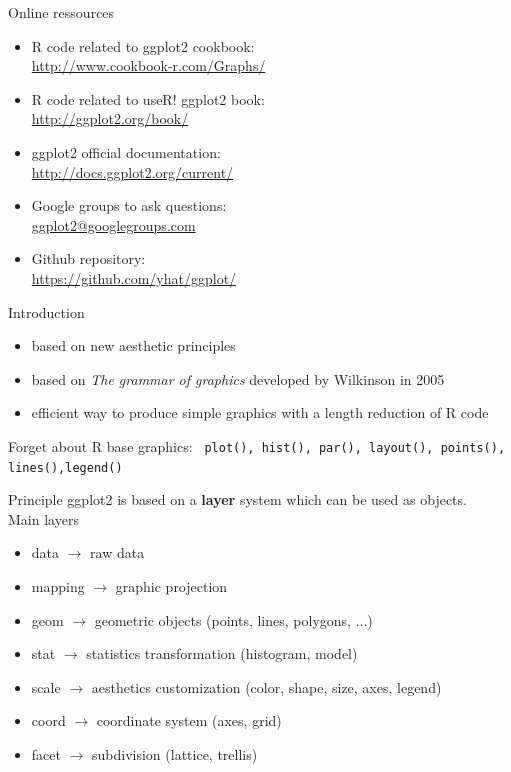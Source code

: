 \documentclass{beamer}\usepackage[]{graphicx}\usepackage[]{color}
\begin{document}
\begin{frame}{Online ressources}
    	\begin{itemize}
        \item R code related to ggplot2 cookbook:\\ \url{http://www.cookbook-r.com/Graphs/}
        \item R code related to useR! ggplot2 book:\\ \url{http://ggplot2.org/book/}
  		  \item ggplot2 official documentation:\\  \url{http://docs.ggplot2.org/current/}
			  \item Google groups to ask questions:\\ \url{ggplot2@googlegroups.com}
        \item Github repository:\\ \url{https://github.com/yhat/ggplot/}
			\end{itemize}
\end{frame}


\begin{frame}{Introduction}
  \begin{itemize}
    \item based on new aesthetic principles
    \item based on \textit{The grammar of graphics} developed by Wilkinson in 2005
    \item efficient way to produce simple graphics with a length reduction of R code
  \end{itemize}
  
  \begin{alertblock}{Forget about R base graphics:}
     \texttt{ plot(), hist(), par(), layout(), points(), lines(),legend()}
  \end{alertblock}
\end{frame}

\begin{frame}{Principle}
ggplot2 is based on a \textbf{layer} system which can be used as objects.\\
\vspace{1cm}
Main layers
  \begin{itemize}
    \item data $\rightarrow$ raw data
    \item mapping $\rightarrow$ graphic projection
    \item geom $\rightarrow$ geometric objects (points, lines, polygons, ...)
    \item stat $\rightarrow$ statistics transformation (histogram, model)
    \item scale $\rightarrow$ aesthetics customization (color, shape, size, axes, legend)
    \item coord $\rightarrow$ coordinate system (axes, grid)
    \item facet $\rightarrow$ subdivision (lattice, trellis)
  \end{itemize}
\end{frame}
\end{document}
